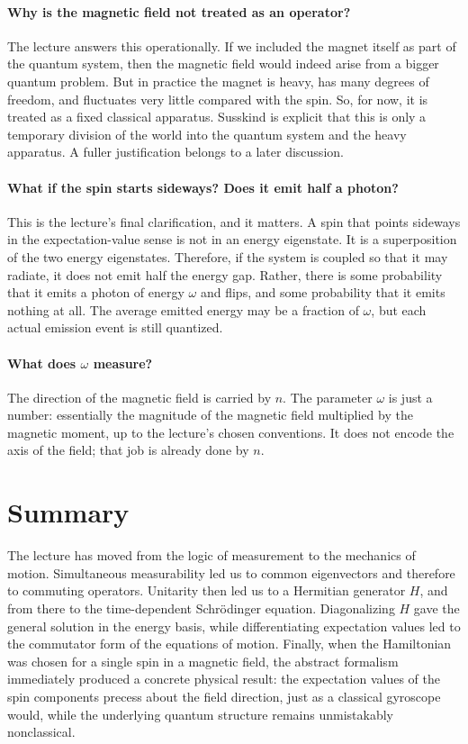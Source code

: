 \paragraph{Why is the magnetic field not treated as an operator?}
The lecture answers this operationally. If we included the magnet itself as part of the quantum system, then the magnetic field would indeed arise from a bigger quantum problem. But in practice the magnet is heavy, has many degrees of freedom, and fluctuates very little compared with the spin. So, for now, it is treated as a fixed classical apparatus. Susskind is explicit that this is only a temporary division of the world into the quantum system and the heavy apparatus. A fuller justification belongs to a later discussion.

\paragraph{What if the spin starts sideways? Does it emit half a photon?}
This is the lecture's final clarification, and it matters. A spin that points sideways in the expectation-value sense is not in an energy eigenstate. It is a superposition of the two energy eigenstates. Therefore, if the system is coupled so that it may radiate, it does not emit half the energy gap. Rather, there is some probability that it emits a photon of energy \(\omega\) and flips, and some probability that it emits nothing at all. The average emitted energy may be a fraction of \(\omega\), but each actual emission event is still quantized.

\paragraph{What does \(\omega\) measure?}
The direction of the magnetic field is carried by \(n\). The parameter \(\omega\) is just a number: essentially the magnitude of the magnetic field multiplied by the magnetic moment, up to the lecture's chosen conventions. It does not encode the axis of the field; that job is already done by \(n\).

\section{Summary}

The lecture has moved from the logic of measurement to the mechanics of motion. Simultaneous measurability led us to common eigenvectors and therefore to commuting operators. Unitarity then led us to a Hermitian generator \(H\), and from there to the time-dependent Schr\"odinger equation. Diagonalizing \(H\) gave the general solution in the energy basis, while differentiating expectation values led to the commutator form of the equations of motion. Finally, when the Hamiltonian was chosen for a single spin in a magnetic field, the abstract formalism immediately produced a concrete physical result: the expectation values of the spin components precess about the field direction, just as a classical gyroscope would, while the underlying quantum structure remains unmistakably nonclassical.